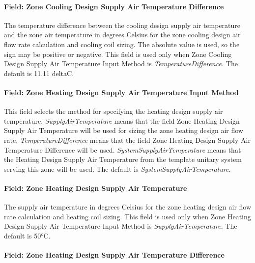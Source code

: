\paragraph{Field: Zone Cooling Design Supply Air Temperature Difference}\label{field-zone-cooling-design-supply-air-temperature-difference-5}

The temperature difference between the cooling design supply air temperature and the zone air temperature in degrees Celsius for the zone cooling design air flow rate calculation and cooling coil sizing. The absolute value is used, so the sign may be positive or negative. This field is used only when Zone Cooling Design Supply Air Temperature Input Method is \emph{TemperatureDifference.} The default is 11.11 deltaC.

\paragraph{Field: Zone Heating Design Supply Air Temperature Input Method}\label{field-zone-heating-design-supply-air-temperature-input-method-5}

This field selects the method for specifying the heating design supply air temperature. \emph{SupplyAirTemperature} means that the field Zone Heating Design Supply Air Temperature will be used for sizing the zone heating design air flow rate. \emph{TemperatureDifference} means that the field Zone Heating Design Supply Air Temperature Difference will be used. \emph{SystemSupplyAirTemperature} means that the Heating Design Supply Air Temperature from the template unitary system serving this zone will be used. The default is \emph{SystemSupplyAirTemperature.}

\paragraph{Field: Zone Heating Design Supply Air Temperature}\label{field-zone-heating-design-supply-air-temperature-4}

The supply air temperature in degrees Celsius for the zone heating design air flow rate calculation and heating coil sizing. This field is used only when Zone Heating Design Supply Air Temperature Input Method is \emph{SupplyAirTemperature.} The default is 50°C.

\paragraph{Field: Zone Heating Design Supply Air Temperature Difference}\label{field-zone-heating-design-supply-air-temperature-difference-5}

